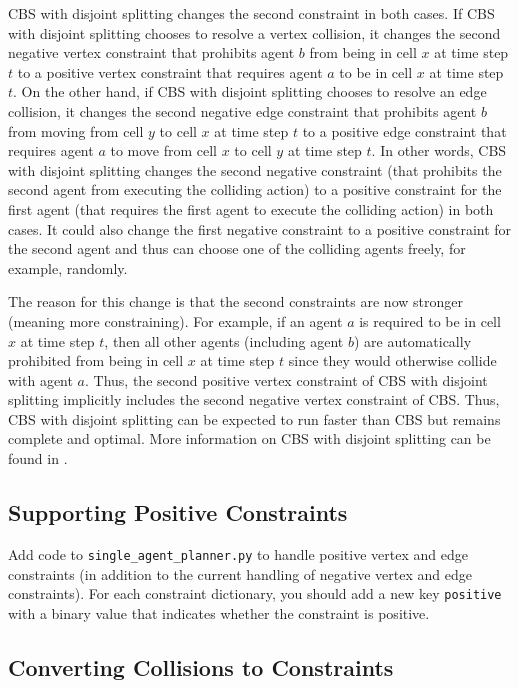 \documentclass[11pt]{article}
\begin{document}
CBS with disjoint splitting changes the second constraint in both cases. If CBS with disjoint splitting chooses to resolve a vertex collision, it changes the second negative vertex constraint that prohibits agent $b$ from being in cell $x$ at time step $t$ to a positive vertex constraint that requires agent $a$ to be in cell $x$ at time step $t$. On the other hand, if CBS with disjoint splitting chooses to resolve an edge collision, it changes the second negative edge constraint that prohibits agent $b$ from moving from cell $y$ to cell $x$ at time step $t$ to a positive edge constraint that requires agent $a$ to move from cell $x$ to cell $y$ at time step $t$. In other words, CBS with disjoint splitting changes the second negative constraint (that prohibits the second agent from executing the colliding action) to a positive constraint for the first agent (that requires the first agent to execute the colliding action) in both cases. It could also change the first negative constraint to a positive constraint for the second agent and thus can choose one of the colliding agents freely, for example, randomly.

The reason for this change is that the second constraints are now stronger (meaning more constraining). For example, if an agent $a$ is required to be in cell $x$ at time step $t$, then all other agents (including agent $b$) are automatically prohibited from being in cell $x$ at time step $t$ since they would otherwise collide with agent $a$. Thus, the second positive vertex constraint of CBS with disjoint splitting implicitly includes the second negative vertex constraint of CBS. Thus, CBS with disjoint splitting can be expected to run faster than CBS but remains complete and optimal. More information on CBS with disjoint splitting can be found in \cite{Li19}.

\subsection{Supporting Positive Constraints}

Add code to \texttt{single\_agent\_planner.py} to handle positive vertex and edge constraints (in addition to the current handling of negative vertex and edge constraints). For each constraint dictionary, you should add a new key \texttt{positive} with a binary value that indicates whether the constraint is positive.

\subsection{Converting Collisions to Constraints}
\end{document}
